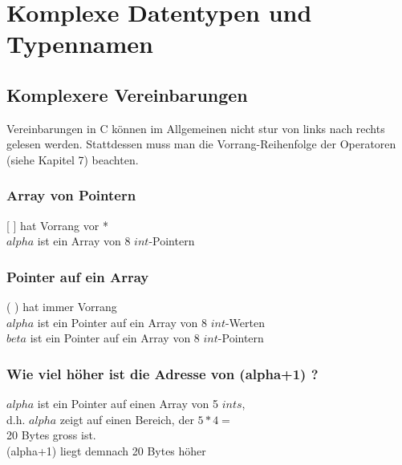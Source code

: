 \section{Komplexe Datentypen und Typennamen }
	\subsection{Komplexere Vereinbarungen }
	 	Vereinbarungen in C können im Allgemeinen nicht stur von links nach rechts gelesen werden. Stattdessen muss man die Vorrang-Reihenfolge der Operatoren (siehe Kapitel 7) beachten.
	 	\subsubsection{Array von Pointern}
			\begin{minipage}[t]{10 cm}
				\vspace*{-0.5cm}
				
			\end{minipage}
			\hspace*{0.5cm}
			\begin{minipage}[t]{10 cm}
				[ ] hat Vorrang vor *\\
				$alpha$ ist ein Array von 8 $int$-Pointern
			\end{minipage}	 	
	 	\subsubsection{Pointer auf ein Array}
		 	\begin{minipage}[t]{10 cm}
		 		\vspace*{-0.5cm}
		 		
		 	\end{minipage}
		 	\hspace*{0.5cm}
		 	\begin{minipage}[t]{10 cm}
		 		( ) hat immer Vorrang\\
		 		$alpha$ ist ein Pointer auf ein Array von 8 $int$-Werten\\
		 		$beta$ ist ein Pointer auf ein Array von 8 $int$-Pointern
		 	\end{minipage}
		\subsubsection{Wie viel höher ist die Adresse von (alpha+1) ?}
			\begin{minipage}[t]{10 cm}
				\vspace*{-0.5cm}
				
			\end{minipage}
			\hspace*{0.5cm}
			\begin{minipage}[t]{10 cm}
				$alpha$ ist ein Pointer auf einen Array von 5 $ints$,\\ d.h. $alpha$ zeigt auf einen Bereich, der $5*4 =$\\ 20 Bytes gross ist.\\ 
				(alpha+1) liegt demnach 20 Bytes höher
			\end{minipage}
